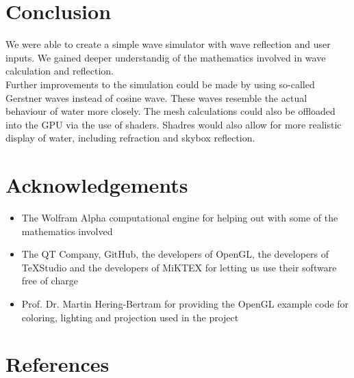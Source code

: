 \documentclass[12pt,a4paper]{scrartcl}
\begin{document}
\section{Conclusion}
We were able to create a simple wave simulator with wave reflection and user inputs. We gained deeper understandig of the mathematics involved in wave calculation and reflection.\\
Further improvements to the simulation could be made by using so-called Gerstner waves instead of cosine wave. These waves resemble the actual behaviour of water more closely. The mesh calculations could also be offloaded into the GPU via the use of shaders. Shadres would also allow for more realistic display of water, including refraction and skybox reflection.\\

\section{Acknowledgements}
\begin{itemize}
	\item The Wolfram Alpha computational engine for helping out with some of the mathematics involved
	\item The QT Company, GitHub, the developers of OpenGL, the developers of TeXStudio and the developers of MiKTEX for letting us use their software free of charge
	\item Prof. Dr. Martin Hering-Bertram for providing the OpenGL example code for coloring, lighting and projection used in the project
\end{itemize}

\section{References}

\printbibliography[title=Sources,nottype=misc]
\printbibliography[title=Pictures,type=misc]
\end{document}
